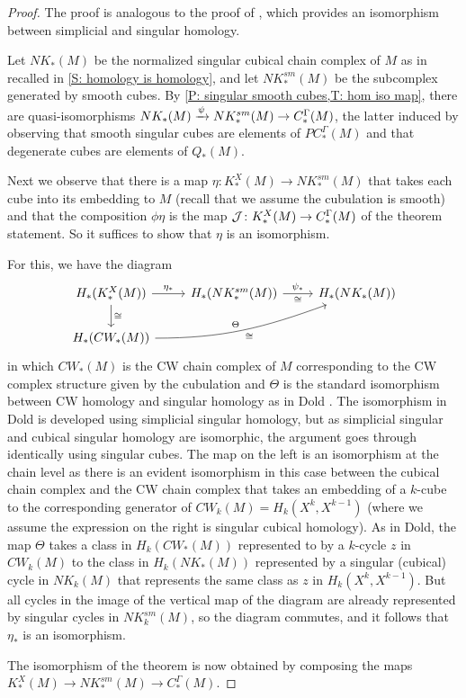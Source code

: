 \begin{proof}
	The proof is analogous to the proof of \cite[Proposition V.8.3]{Dol72}, which provides an isomorphism between simplicial and singular homology.

	Let $NK_*(M)$ be the normalized singular cubical chain complex of $M$ as in recalled in \cref{S: homology is homology}, and let $NK^{sm}_*(M)$ be the subcomplex generated by smooth cubes.
	By \cref{P: singular smooth cubes,T: hom iso map}, there are quasi-isomorphisms $NK_*(M) \xrightarrow{\psi} NK^{sm}_*(M) \to C^\Gamma_*(M)$, the latter induced by observing that smooth singular cubes are elements of $PC^\Gamma_*(M)$ and that degenerate cubes are elements of $Q_*(M)$.

	Next we observe that there is a map $\eta: K^X_*(M) \to NK^{sm}_*(M)$ that takes each cube into its embedding to $M$ (recall that we assume the cubulation is smooth) and that the composition $\phi\eta$ is the map $\mathcal{J} \colon K^X_*(M) \to C^\Gamma_*(M)$ of the theorem statement.
	So it suffices to show that $\eta$ is an isomorphism.

	For this, we have the diagram
	\[
	\begin{tikzcd}
		H_*(K^X_*(M)) \arrow[r, "\eta_*"] \arrow[d, "\cong"] & H_*(NK^{sm}_*(M)) \arrow[r, "\psi_*", "\cong"'] & H_*(NK_*(M)) \\
		H_*(CW_*(M)) \arrow[rru, "\Theta", "\cong"', out=0, in=200] & &
	\end{tikzcd}
	\]
	in which $CW_*(M)$ is the CW chain complex of $M$ corresponding to the CW complex structure given by the cubulation and $\Theta$ is the standard isomorphism between CW homology and singular homology as in Dold \cite[Proposition V.1.9]{Dol72}.
	The isomorphism in Dold is developed using simplicial singular homology, but as simplicial singular and cubical singular homology are isomorphic, the argument goes through identically using singular cubes.
	The map on the left is an isomorphism at the chain level as there is an evident isomorphism in this case between the cubical chain complex and the CW chain complex that takes an embedding of a $k$-cube to the corresponding generator of $CW_k(M) = H_k(X^k, X^{k-1})$ (where we assume the expression on the right is singular cubical homology).
	As in Dold, the map $\Theta$ takes a class in $H_k(CW_*(M))$ represented to by a $k$-cycle $z$ in $CW_k(M)$ to the class in $H_k(NK_*(M))$ represented by a singular (cubical) cycle in $NK_k(M)$ that represents the same class as $z$ in $H_k(X^k,X^{k-1})$.
	But all cycles in the image of the vertical map of the diagram are already represented by singular cycles in $NK^{sm}_k(M)$, so the diagram commutes, and it follows that $\eta_*$ is an isomorphism.

	The isomorphism of the theorem is now obtained by composing the maps $K_*^X(M) \to NK^{sm}_*(M) \to C_*^\Gamma(M)$.
\end{proof}


